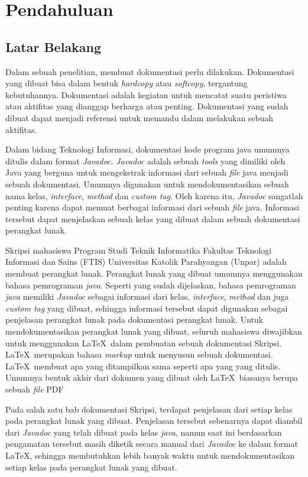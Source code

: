 \chapter{Pendahuluan}
\label{chap:intro}
   
\section{Latar Belakang}
\label{sec:label}

Dalam sebuah penelitian, membuat dokumentasi perlu dilakukan. Dokumentasi yang dibuat bisa dalam bentuk {\it hardcopy} atau {\it softcopy}, tergantung kebutuhannya. Dokumentasi adalah kegiatan untuk mencatat suatu peristiwa atau aktifitas yang dianggap berharga atau penting. Dokumentasi yang sudah dibuat dapat menjadi referensi untuk memandu dalam melakukan sebuah aktifitas.

Dalam bidang Teknologi Informasi, dokumentasi kode program java umumnya ditulis dalam format {\it Javadoc}. {\it Javadoc} adalah sebuah {\it tools} yang dimiliki oleh Java yang berguna untuk mengekstrak informasi dari sebuah {\it file} java menjadi sebuah dokumentasi. Umumnya digunakan untuk mendokumentasikan sebuah nama kelas, {\it interface}, {\it method} dan {\it custom tag}. Oleh karena itu, {\it Javadoc} sangatlah penting karena dapat memuat berbagai informasi dari sebuah {\it file} java. Informasi tersebut dapat menjelaskan sebuah kelas yang dibuat dalam sebuah dokumentasi perangkat lunak. 

Skripsi mahasiswa Program Studi Teknik Informatika Fakultas Teknologi Informasi dan Sains (FTIS) Universitas Katolik Parahyangan (Unpar) adalah membuat perangkat lunak. Perangkat lunak yang dibuat umumnya menggunakan bahasa pemrograman {\it java}. Seperti yang sudah dijelaskan, bahasa pemrograman {\it java} memiliki {\it Javadoc} sebagai informasi dari kelas, {\it interface}, {\it method} dan juga {\it custom tag} yang dibuat, sehingga informasi tersebut dapat digunakan sebagai penjelasan perangkat lunak pada dokumentasi perangkat lunak. Untuk mendokumentasikan perangkat lunak yang dibuat, seluruh mahasiswa diwajibkan untuk menggunakan \LaTeX\ dalam pembuatan sebuah dokumentasi Skripsi. \LaTeX\ merupakan bahasa {\it markup} untuk menyusun sebuah dokumentasi. \LaTeX\ membuat apa yang ditampilkan sama seperti apa yang yang ditulis. Umumnya bentuk akhir dari dokumen yang dibuat oleh \LaTeX\ biasanya berupa sebuah {\it file} PDF

Pada salah satu bab dokumentasi Skripsi, terdapat penjelasan dari setiap kelas pada perangkat lunak yang dibuat. Penjelasan tersebut sebenarnya dapat diambil dari {\it Javadoc} yang telah dibuat pada kelas {\it java}, namun saat ini berdasarkan pengamatan tersebut masih diketik secara manual dari {\it Javadoc} ke dalam format \LaTeX, sehingga membutuhkan lebih banyak waktu untuk mendokumentasikan setiap kelas pada perangkat lunak yang dibuat.

